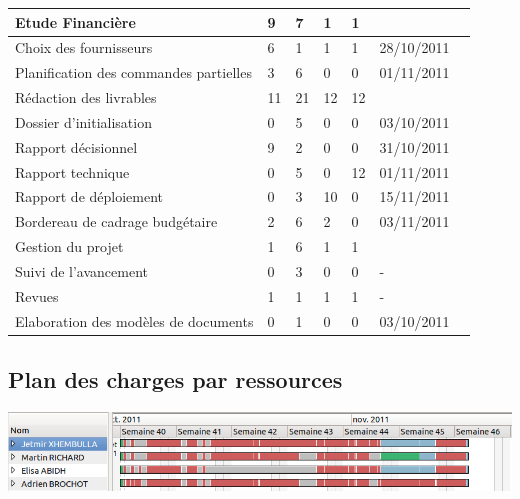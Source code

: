 \begin{tabular}{|l|l|l|l|l|l|c|}
\rowcolor{Activite} Etude Financière		&	9	&	7	&	1	&	1	&	\\ \hline
Choix des fournisseurs						&	6	&	1	&	1	&	1	&	28/10/2011	\\ \hline
Planification des commandes partielles 		&	3	&	6	&	0	&	0	&	01/11/2011	\\ \hline

\rowcolor{Activite} Rédaction des livrables	&	11	&	21	&	12	&	12	&	\\ \hline
Dossier d'initialisation					&	0	&	5	&	0	&	0	&	03/10/2011	\\ \hline
Rapport décisionnel							&	9	&	2	&	0	&	0	&	31/10/2011 	\\ \hline
Rapport technique 							&	0	&	5	&	0	&	12	&	01/11/2011	\\ \hline
Rapport de déploiement						&	0	&	3	&	10	&	0	&	15/11/2011	\\ \hline
Bordereau de cadrage budgétaire				&	2	&	6	&	2	&	0	&	03/11/2011	\\ \hline

\rowcolor{Activite} Gestion du projet 		&	1	&	6	&	1	&	1	& \\ \hline
Suivi de l'avancement						&	0	&	3	&	0	&	0	&	-	\\ \hline
Revues										&	1	&	1	&	1	&	1	& 	- 	\\ \hline
Elaboration des modèles de documents		&	0	&	1	&	0	&	0	&	03/10/2011	\\ \hline

\end{tabular}

\subsection{Plan des charges par ressources}
\includegraphics[scale=0.9]{Ressources.png}

